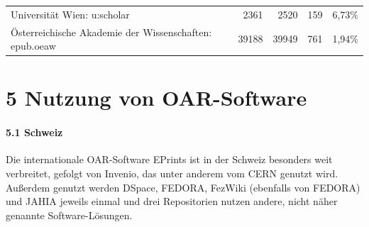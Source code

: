 \documentclass[a4paper,
fontsize=11pt,
oneside,
numbers=noperiodatend,
parskip=half-,
bibliography=totoc,
final
]{scrartcl}
\begin{document}
\begin{longtable}[c]{@{}lrrrr@{}}
\begin{minipage}[t]{0.31\columnwidth}
Universität Wien: u:scholar
\strut\end{minipage} &
\begin{minipage}[t]{0.14\columnwidth}\raggedleft\strut
2361
\strut\end{minipage} &
\begin{minipage}[t]{0.15\columnwidth}\raggedleft\strut
2520
\strut\end{minipage} &
\begin{minipage}[t]{0.14\columnwidth}\raggedleft\strut
159
\strut\end{minipage} &
\begin{minipage}[t]{0.14\columnwidth}\raggedleft\strut
6,73\%
\strut\end{minipage}\tabularnewline
\begin{minipage}[t]{0.31\columnwidth}\raggedright\strut
Österreichische Akademie der Wissenschaften: epub.oeaw
\strut\end{minipage} &
\begin{minipage}[t]{0.14\columnwidth}\raggedleft\strut
39188
\strut\end{minipage} &
\begin{minipage}[t]{0.15\columnwidth}\raggedleft\strut
39949
\strut\end{minipage} &
\begin{minipage}[t]{0.14\columnwidth}\raggedleft\strut
761
\strut\end{minipage} &
\begin{minipage}[t]{0.14\columnwidth}\raggedleft\strut
1,94\%
\strut\end{minipage}\tabularnewline
\bottomrule
\end{longtable}

\section*{5 Nutzung von
OAR-Software}\label{nutzung-von-oar-software}

\paragraph{5.1 Schweiz}\label{schweiz-2}

Die internationale OAR-Software EPrints ist in der Schweiz besonders
weit verbreitet, gefolgt von Invenio, das unter anderem vom CERN genutzt
wird. Außerdem genutzt werden DSpace, FEDORA, FezWiki (ebenfalls von
FEDORA) und JAHIA jeweils einmal und drei Repositorien nutzen andere,
nicht näher genannte Software-Lösungen.
\end{document}
